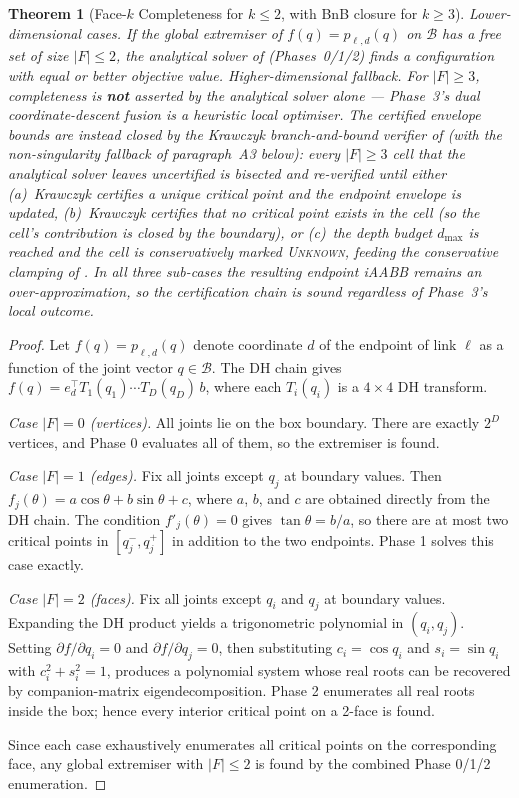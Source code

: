\documentclass[journal]{IEEEtran}
\newtheorem{theorem}{Theorem}
\begin{document}
\begin{theorem}[Face-$k$ Completeness for $k \leq 2$, with BnB closure for $k\geq 3$]\label{thm:face}
\emph{Lower-dimensional cases.} If the global extremiser of
$f(q)=p_{\ell,d}(q)$ on $\mathcal{B}$ has a free set of size
$|F|\leq 2$, the analytical solver of 
(Phases~0/1/2) finds a configuration with equal or better objective
value.
\emph{Higher-dimensional fallback.} For $|F|\geq 3$, completeness is
\textbf{not} asserted by the analytical solver alone --- Phase~3’s
dual coordinate-descent fusion is a heuristic local optimiser. The
certified envelope bounds are instead closed by the Krawczyk
branch-and-bound verifier of  (with the non-singularity
fallback of paragraph~A3 below): every $|F|\geq 3$ cell that the
analytical solver leaves uncertified is bisected and re-verified
until either (a)~Krawczyk certifies a unique critical point and the
endpoint envelope is updated, (b)~Krawczyk certifies that no
critical point exists in the cell (so the cell’s contribution is
closed by the boundary), or (c)~the depth budget $d_{\max}$ is
reached and the cell is conservatively marked \textsc{Unknown},
feeding the conservative clamping of . In all three
sub-cases the resulting endpoint iAABB remains an over-approximation,
so the certification chain is sound regardless of Phase~3’s local
outcome.
\end{theorem}

\begin{proof}
Let $f(q) = p_{\ell,d}(q)$ denote coordinate $d$ of the endpoint of
link $\ell$ as a function of the joint vector $q \in \mathcal{B}$. The
DH chain gives
$f(q) = e_d^\top T_1(q_1) \cdots T_D(q_D)\,b$,
where each $T_i(q_i)$ is a $4{\times}4$ DH transform.

\emph{Case $|F| = 0$ (vertices).}
All joints lie on the box boundary. There are exactly $2^D$ vertices,
and Phase 0 evaluates all of them, so the extremiser is found.

\emph{Case $|F| = 1$ (edges).}
Fix all joints except $q_j$ at boundary values. Then
$f_j(\theta) = a\cos\theta + b\sin\theta + c$, where $a$, $b$, and $c$
are obtained directly from the DH chain. The condition
$f'_j(\theta) = 0$ gives $\tan\theta = b/a$, so there are at most two
critical points in $[q_j^-, q_j^+]$ in addition to the two endpoints.
Phase 1 solves this case exactly.

\emph{Case $|F| = 2$ (faces).}
Fix all joints except $q_i$ and $q_j$ at boundary values. Expanding the
DH product yields a trigonometric polynomial in $(q_i, q_j)$. Setting
$\partial f/\partial q_i = 0$ and $\partial f/\partial q_j = 0$, then
substituting $c_i = \cos q_i$ and $s_i = \sin q_i$ with
$c_i^2 + s_i^2 = 1$, produces a polynomial system whose real roots can
be recovered by companion-matrix eigendecomposition. Phase 2 enumerates
all real roots inside the box; hence every interior critical point on a
2-face is found.

Since each case exhaustively enumerates all critical points on the
corresponding face, any global extremiser with $|F| \leq 2$ is found by
the combined Phase 0/1/2 enumeration.
\end{proof}
\end{document}
